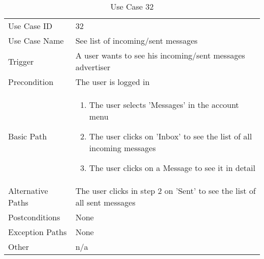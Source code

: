 \begin{table}[H]
\centering
\label{table-use-case-32}
\begin{tabular}{|p{3cm}|p{10cm}}
Use Case ID       & 32                                                           
\\
Use Case Name     & See list of incoming/sent messages                                                         
\\
Trigger           & A user wants to see his incoming/sent messages
advertiser
\\
Precondition      & The user is logged in                                                
\\
Basic Path        & \begin{enumerate}
\item The user selects 'Messages' in the account menu
\item The user clicks on 'Inbox' to see the list of all incoming messages
\item The user clicks on a Message to see it in detail
\end{enumerate} 
     \\
Alternative Paths & The user clicks in step 2 on 'Sent' to see the list of all
sent messages
\\
Postconditions    & None
\\
Exception Paths   & None
\\
Other             & n/a                                                                                                                                                                                                        
\end{tabular}
\caption{Use Case 32}
\end{table}


